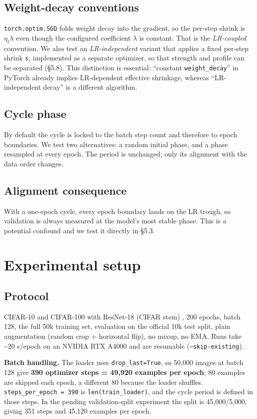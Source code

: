 \documentclass[11pt,a4paper]{article}
\begin{document}
\subsection{Weight-decay conventions}
\texttt{torch.optim.SGD} folds weight decay into the gradient, so the per-step shrink is $\eta_t \lambda$ even though the configured coefficient $\lambda$ is constant. That is the \textit{LR-coupled} convention. We also test an \textit{LR-independent} variant that applies a fixed per-step shrink \texttt{s}, implemented as a separate optimizer, so that strength and profile can be separated (\S{}5.8). This distinction is essential: ``constant \texttt{weight\_decay}'' in PyTorch already implies LR-dependent effective shrinkage, whereas ``LR-independent decay'' is a different algorithm.

\subsection{Cycle phase}
By default the cycle is locked to the batch step count and therefore to epoch boundaries. We test two alternatives: a random initial phase, and a phase resampled at every epoch. The period is unchanged; only its alignment with the data order changes.

\subsection{Alignment consequence}
With a one-epoch cycle, every epoch boundary lands on the LR trough, so validation is always measured at the model's most stable phase. This is a potential confound and we test it directly in \S{}5.3.

\section{Experimental setup}
\subsection{Protocol}
CIFAR-10 and CIFAR-100 \cite{ref13} with ResNet-18 (CIFAR stem) \cite{ref14}, 200 epochs, batch 128, the full 50k training set, evaluation on the official 10k test split, plain augmentation (random crop + horizontal flip), no mixup, no EMA. Runs take \textasciitilde{}20 s/epoch on an NVIDIA RTX A4000 and are resumable (\texttt{--skip-existing}).

\textbf{Batch handling.} The loader uses \texttt{drop\_last=True}, so 50,000 images at batch 128 give \textbf{390 optimizer steps = 49,920 examples per epoch}; 80 examples are skipped each epoch, a different 80 because the loader shuffles. \texttt{steps\_per\_epoch = 390} is \texttt{len(train\_loader)}, and the cycle period is defined in those steps. In the pending validation-split experiment the split is 45,000/5,000, giving 351 steps and 45,120 examples per epoch.
\end{document}
